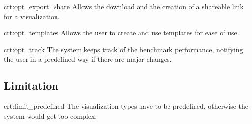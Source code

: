 {crt:opt_export_share}
{Allows the download and the creation of a shareable link for a visualization.}

{crt:opt_templates}
{Allows the \gls{user} to create and use \glspl{template} for ease of use.}

{crt:opt_track}
{The system keeps track of the benchmark performance, notifying the \gls{user} in a predefined way if there are major changes.}


\subsection{Limitation}

{crt:limit_predefined}
{The \gls{visualization} types have to be predefined, otherwise the system would get too complex.}
